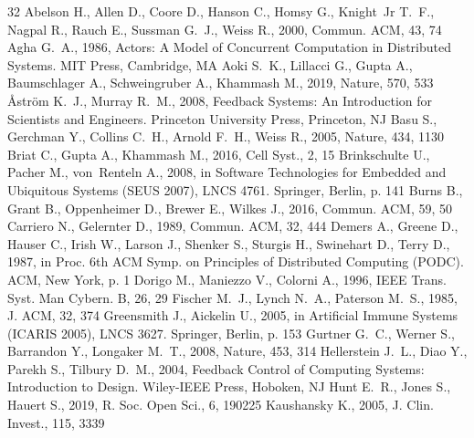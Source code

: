 \documentclass[twoside,twocolumn,usenatbib]{mnras}
\begin{document}
\begin{thebibliography}{32}
 Abelson H., Allen D., Coore D.,
  Hanson C., Homsy G., Knight~Jr T.~F., Nagpal R., Rauch E., Sussman G.~J.,
  Weiss R., 2000, Commun. ACM, 43, 74
 Agha G.~A., 1986, Actors: A Model of
  Concurrent Computation in Distributed Systems. MIT Press, Cambridge, MA
 Aoki S.~K., Lillacci G., Gupta A.,
  Baumschlager A., Schweingruber A., Khammash M., 2019, Nature, 570,
  533
 {\AA}str{\"o}m K.~J.,
  Murray R.~M., 2008, Feedback Systems: An Introduction for Scientists
  and Engineers. Princeton University Press, Princeton, NJ
 Basu S., Gerchman Y., Collins C.~H.,
  Arnold F.~H., Weiss R., 2005, Nature, 434, 1130
 Briat C., Gupta A., Khammash M.,
  2016, Cell Syst., 2, 15
 Brinkschulte U.,
  Pacher M., von~Renteln A., 2008, in Software Technologies for Embedded
  and Ubiquitous Systems (SEUS 2007), LNCS 4761. Springer, Berlin,
  p. 141
 Burns B., Grant B.,
  Oppenheimer D., Brewer E., Wilkes J., 2016, Commun. ACM, 59, 50
 Carriero N.,
  Gelernter D., 1989, Commun. ACM, 32, 444
 Demers A., Greene D., Hauser C.,
  Irish W., Larson J., Shenker S., Sturgis H., Swinehart D., Terry D.,
  1987, in Proc. 6th ACM Symp. on Principles of Distributed Computing
  (PODC). ACM, New York, p. 1
 Dorigo M., Maniezzo V.,
  Colorni A., 1996, IEEE Trans. Syst. Man Cybern. B, 26, 29
 Fischer M.~J., Lynch N.~A.,
  Paterson M.~S., 1985, J. ACM, 32, 374
 Greensmith J.,
  Aickelin U., 2005, in Artificial Immune Systems (ICARIS 2005), LNCS
  3627. Springer, Berlin, p. 153
 Gurtner G.~C., Werner S.,
  Barrandon Y., Longaker M.~T., 2008, Nature, 453, 314
 Hellerstein J.~L.,
  Diao Y., Parekh S., Tilbury D.~M., 2004, Feedback Control of Computing
  Systems: Introduction to Design. Wiley-IEEE Press, Hoboken, NJ
 Hunt E.~R., Jones S., Hauert S.,
  2019, R. Soc. Open Sci., 6, 190225
 Kaushansky K., 2005,
  J. Clin. Invest., 115, 3339

\end{thebibliography}
\end{document}
